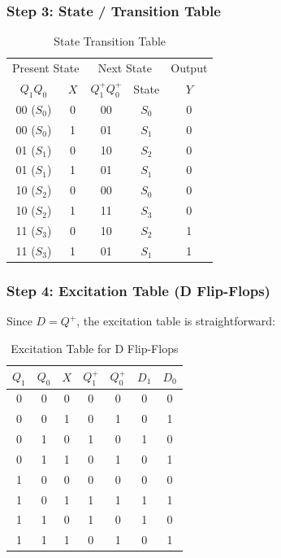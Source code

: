 \documentclass[12pt,a4paper]{article}
\begin{document}
\subsubsection{Step 3: State / Transition Table}

\begin{table}[H]
\centering
\caption{State Transition Table}
\begin{tabular}{cc|cc|c}
\toprule
\multicolumn{2}{c|}{Present State} & \multicolumn{2}{c|}{Next State} & Output \\
$Q_1 Q_0$ & $X$ & $Q_1^+ Q_0^+$ & State & $Y$ \\
\midrule
00 ($S_0$) & 0 & 00 & $S_0$ & 0 \\
00 ($S_0$) & 1 & 01 & $S_1$ & 0 \\
01 ($S_1$) & 0 & 10 & $S_2$ & 0 \\
01 ($S_1$) & 1 & 01 & $S_1$ & 0 \\
10 ($S_2$) & 0 & 00 & $S_0$ & 0 \\
10 ($S_2$) & 1 & 11 & $S_3$ & 0 \\
11 ($S_3$) & 0 & 10 & $S_2$ & 1 \\
11 ($S_3$) & 1 & 01 & $S_1$ & 1 \\
\bottomrule
\end{tabular}
\end{table}

\subsubsection{Step 4: Excitation Table (D Flip-Flops)}

Since $D = Q^+$, the excitation table is straightforward:

\begin{table}[H]
\centering
\caption{Excitation Table for D Flip-Flops}
\begin{tabular}{ccc|cc|cc}
\toprule
$Q_1$ & $Q_0$ & $X$ & $Q_1^+$ & $Q_0^+$ & $D_1$ & $D_0$ \\
\midrule
0 & 0 & 0 & 0 & 0 & 0 & 0 \\
0 & 0 & 1 & 0 & 1 & 0 & 1 \\
0 & 1 & 0 & 1 & 0 & 1 & 0 \\
0 & 1 & 1 & 0 & 1 & 0 & 1 \\
1 & 0 & 0 & 0 & 0 & 0 & 0 \\
1 & 0 & 1 & 1 & 1 & 1 & 1 \\
1 & 1 & 0 & 1 & 0 & 1 & 0 \\
1 & 1 & 1 & 0 & 1 & 0 & 1 \\
\bottomrule
\end{tabular}
\end{table}
\end{document}
